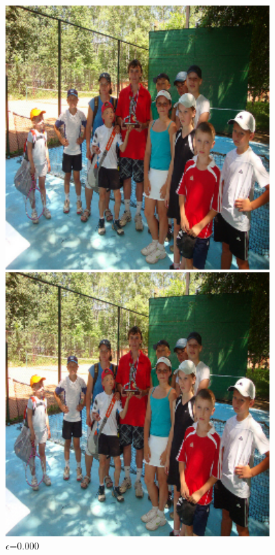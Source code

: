 \begin{figure}[h]
    \centering
    \begin{minipage}{0.12\textwidth}
        \centering
        \includegraphics[width=0.9\textwidth]{figures/group_of_people/group_of_people_0.000.png}
        \caption*{$\epsilon$=0.000}
    \end{minipage}\hfill
    \begin{minipage}{0.12\textwidth}
        \centering
        \includegraphics[width=0.9\textwidth]{figures/group_of_people/group_of_people_0.005.png}

\end{minipage}
\end{figure}

